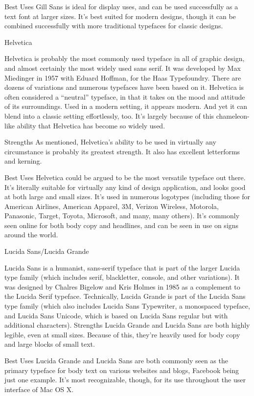 \documentclass[12pt,a4paper,twocolumn]{book} %
\begin{document}
Best Uses
Gill Sans is ideal for display uses, and can be used successfully as a text font at larger sizes. It’s best suited for modern designs, though it can be combined successfully with more traditional typefaces for classic designs.

 
Helvetica

Helvetica is probably the most commonly used typeface in all of graphic design, and almost certainly the most widely used sans serif. It was developed by Max Miedinger in 1957 with Eduard Hoffman, for the Haas Typefoundry. There are dozens of variations and numerous typefaces have been based on it.
Helvetica is often considered a “neutral” typeface, in that it takes on the mood and attitude of its surroundings. Used in a modern setting, it appears modern. And yet it can blend into a classic setting effortlessly, too. It’s largely because of this chameleon-like ability that Helvetica has become so widely used.

Strengths
As mentioned, Helvetica’s ability to be used in virtually any circumstance is probably its greatest strength. It also has excellent letterforms and kerning.

Best Uses
Helvetica could be argued to be the most versatile typeface out there. It’s literally suitable for virtually any kind of design application, and looks good at both large and small sizes. It’s used in numerous logotypes (including those for American Airlines, American Apparel, 3M, Verizon Wireless, Motorola, Panasonic, Target, Toyota, Microsoft, and many, many others). It’s commonly seen online for both body copy and headlines, and can be seen in use on signs around the world.

 
Lucida Sans/Lucida Grande

Lucida Sans is a humanist, sans-serif typeface that is part of the larger Lucida type family (which includes serif, blackletter, console, and other variations). It was designed by Chalres Bigelow and Kris Holmes in 1985 as a complement to the Lucida Serif typeface. Technically, Lucida Grande is part of the Lucida Sans type family (which also includes Lucida Sans Typewriter, a monospaced typeface, and Lucida Sans Unicode, which is based on Lucida Sans regular but with additional characters).
Strengths
Lucida Grande and Lucida Sans are both highly legible, even at small sizes. Because of this, they’re heavily used for body copy and large blocks of small text.

Best Uses
Lucida Grande and Lucida Sans are both commonly seen as the primary typeface for body text on various websites and blogs, Facebook being just one example. It’s most recognizable, though, for its use throughout the user interface of Mac OS X.
\end{document}
